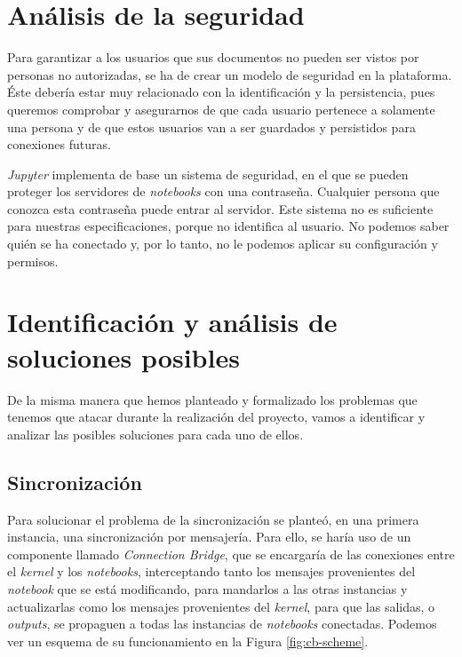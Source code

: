 \documentclass[11pt,spanish,listoffigures]{tfgetsinf}
\begin{document}

\section{Análisis de la seguridad}
\label{sec:analisis-seguridad}

Para garantizar a los usuarios que sus documentos no pueden ser vistos por personas no autorizadas, se ha de crear un modelo de seguridad en la plataforma. Éste debería estar muy relacionado con la identificación y la persistencia, pues queremos comprobar y asegurarnos de que cada usuario pertenece a solamente una persona y de que estos usuarios van a ser guardados y persistidos para conexiones futuras.

\textit{Jupyter} implementa de base un sistema de seguridad, en el que se pueden proteger los servidores de \textit{notebooks} con una contraseña. Cualquier persona que conozca esta contraseña puede entrar al servidor. Este sistema no es suficiente para nuestras especificaciones, porque no identifica al usuario. No podemos saber quién se ha conectado y, por lo tanto, no le podemos aplicar su configuración y permisos.



\section{Identificación y análisis de soluciones posibles}
\label{sec:ident-soluciones}

De la misma manera que hemos planteado y formalizado los problemas que tenemos que atacar durante la realización del proyecto, vamos a identificar y analizar las posibles soluciones para cada uno de ellos. 


\subsection{Sincronización}
\label{subsec:sincro}

Para solucionar el problema de la sincronización se planteó, en una primera instancia, una sincronización por mensajería. Para ello, se haría uso de un componente llamado \textit{Connection Bridge}, que se encargaría de las conexiones entre el \textit{kernel} y los \textit{notebooks}, interceptando tanto los mensajes provenientes del \textit{notebook} que se está modificando, para mandarlos a las otras instancias y actualizarlas como los mensajes provenientes del \textit{kernel}, para que las salidas, o \textit{outputs}, se propaguen a todas las instancias de \textit{notebooks} conectadas. Podemos ver un esquema de su funcionamiento en la Figura \ref{fig:cb-scheme}.
\end{document}
